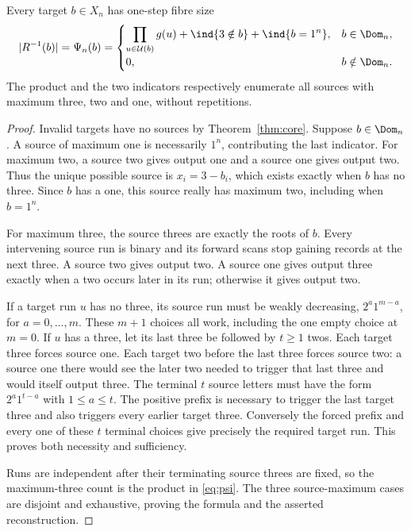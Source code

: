 \begin{theorem}\label{thm:inverse}
Every target $b\in X_n$ has one-step fibre size
\begin{equation}\label{eq:psi}
 |R^{-1}(b)|=\Psi_n(b)=
 \begin{cases}
 \displaystyle\prod_{u\in\mathcal U(b)}g(u)
   +\ind\{3\notin b\}+\ind\{b=1^n\},&b\in\Dom_n,\\
 0,&b\notin\Dom_n.
 \end{cases}
\end{equation}
The product and the two indicators respectively enumerate all sources
with maximum three, two and one, without repetitions.
\end{theorem}
\begin{proof}
Invalid targets have no sources by Theorem~\ref{thm:core}. Suppose
$b\in\Dom_n$. A source of maximum one is necessarily $1^n$, contributing
the last indicator. For maximum two, a source two gives output one and
a source one gives output two. Thus the unique possible source is
$x_i=3-b_i$, which exists exactly when $b$ has no three. Since $b$ has
a one, this source really has maximum two, including when $b=1^n$.

For maximum three, the source threes are exactly the roots of $b$.
Every intervening source run is binary and its forward scans stop gaining
records at the next three. A source two gives output two. A source one
gives output three exactly when a two occurs later in its run; otherwise
it gives output two.

If a target run $u$ has no three, its source run must be weakly decreasing,
$2^a1^{m-a}$, for $a=0,\ldots,m$. These $m+1$ choices all work,
including the one empty choice at $m=0$.
If $u$ has a three, let its last three be followed by $t\ge1$ twos.
Each target three forces source one. Each target two before the last
three forces source two: a source one there would see the later two
needed to trigger that last three and would itself output three.
The terminal $t$ source letters must have the form $2^a1^{t-a}$ with
$1\le a\le t$. The positive prefix is necessary to trigger the last
target three and also triggers every earlier target three. Conversely the
forced prefix and every one of these $t$ terminal choices give precisely
the required target run. This proves both necessity and sufficiency.

Runs are independent after their terminating source threes are fixed, so
the maximum-three count is the product in \eqref{eq:psi}. The three
source-maximum cases are disjoint and exhaustive, proving the formula
and the asserted reconstruction.
\end{proof}

